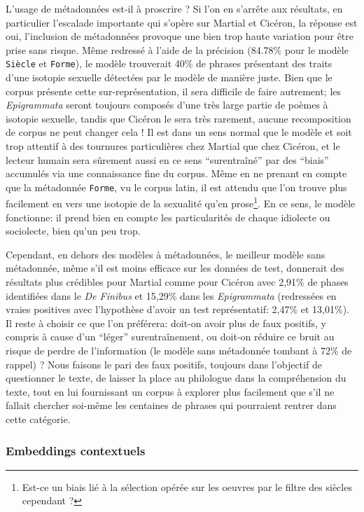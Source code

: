 L'usage de métadonnées est-il à proscrire ? Si l'on en s'arrête aux résultats, en particulier l'escalade importante qui s'opère sur Martial et Cicéron, la réponse est oui, l'inclusion de métadonnées provoque une bien trop haute variation pour être prise sans risque. Même redressé à l'aide de la précision (84.78\% pour le modèle \texttt{Siècle} et \texttt{Forme}), le modèle trouverait 40\% de phrases présentant des traits d'une isotopie sexuelle détectées par le modèle de manière juste. Bien que le corpus présente cette sur-représentation, il sera difficile de faire autrement; les \textit{Epigrammata} seront toujours composés d'une très large partie de poèmes à isotopie sexuelle, tandis que Cicéron le sera très rarement, aucune recomposition de corpus ne peut changer cela ! Il est dans un sens normal que le modèle et soit trop attentif à des tournures particulières chez Martial que chez Cicéron, et le lecteur humain sera sûrement aussi en ce sens \enquote{surentraîné} par des \enquote{biais} accumulés via une connaissance fine du corpus. Même en ne prenant en compte que la métadonnée \texttt{Forme}, vu le corpus latin, il est attendu que l'on trouve plus facilement en vers une isotopie de la sexualité qu'en prose\footnote{Est-ce un biais lié à la sélection opérée sur les oeuvres par le filtre des siècles cependant ?}. En ce sens, le modèle fonctionne: il prend bien en compte les particularités de chaque idiolecte ou sociolecte, bien qu'un peu trop.

Cependant, en dehors des modèles à métadonnées, le meilleur modèle sans métadonnée, même s'il est moins efficace sur les données de test, donnerait des résultats plus crédibles pour Martial comme pour Cicéron avec 2,91\% de phases identifiées dans le \textit{De Finibus} et 15,29\% dans les \textit{Epigrammata} (redressées en vraies positives avec l'hypothèse d'avoir un test représentatif: 2,47\% et 13,01\%). Il reste à choisir ce que l'on préférera: doit-on avoir plus de faux positifs, y compris à cause d'un \enquote{léger} surentraînement, ou doit-on réduire ce bruit au risque de perdre de l'information (le modèle sans métadonnée tombant à 72\% de rappel) ? Nous faisons le pari des faux positifs, toujours dans l'objectif de questionner le texte, de laisser la place au philologue dans la compréhension du texte, tout en lui fournissant un corpus à explorer plus facilement que s'il ne fallait chercher soi-même les centaines de phrases qui pourraient rentrer dans cette catégorie.

\subsubsection{Embeddings contextuels}

